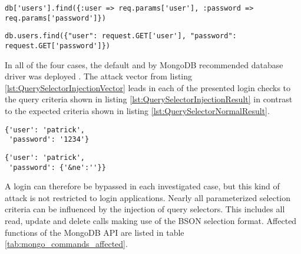 \begin{lstlisting}[caption={Vulnerable Ruby example for query selector injection against MongoDB}, label={lst:RubyQuerySelectorInjection}]
db['users'].find({:user => req.params['user'], :password => req.params['password']})
\end{lstlisting}

\begin{lstlisting}[caption={Vulnerable Python example for query selector injection against MongoDB}, label={lst:PythonQuerySelectorInjection}]
db.users.find({"user": request.GET['user'], "password": request.GET['password']})
\end{lstlisting}

In all of the four cases, the default and by MongoDB recommended database driver was deployed \cite{MongoDB_Drivers2016}. The attack vector from listing \ref{lst:QuerySelectorInjectionVector} leads in each of the presented login checks to the query criteria shown in listing \ref{lst:QuerySelectorInjectionResult} in contrast to the expected criteria shown in listing \ref{lst:QuerySelectorNormalResult}. \\

\begin{minipage}{.97\textwidth}
\begin{minipage}[t]{.49\textwidth}
\begin{lstlisting}[caption={Resulting query of normal request}, label={lst:QuerySelectorNormalResult}]
{'user': 'patrick', 
 'password': '1234'}
\end{lstlisting}
\end{minipage}
\hfill
\begin{minipage}[t]{.49\textwidth}
\begin{lstlisting}[escapechar=!,caption={Resulting query of query selector injection}, label={lst:QuerySelectorInjectionResult}]
{'user': 'patrick',
 'password': {'&ne':''}}
\end{lstlisting}
\end{minipage}
\end{minipage}

A login can therefore be bypassed in each investigated case, but this kind of attack is not restricted to login applications. Nearly all parameterized selection criteria can be influenced by the injection of query selectors. This includes all read, update and delete calls making use of the BSON selection format. Affected functions of the MongoDB API \cite{MongoDB_CollFunc.2016} are listed in table \ref{tab:mongo_commands_affected}.\\

